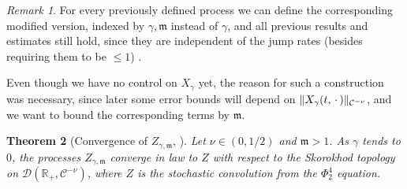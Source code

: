 \documentclass{report}
\newcommand{\RR}{\mathbb{R}}
\DeclarePairedDelimiter\norm{\lVert}{\rVert}%
\newcommand{\Placeholder}{\,\mathrel{\cdot}\,}
\newtheorem{theorem}{Theorem}[chapter]
\theoremstyle{remark}
\newtheorem{remark}[theorem]{Remark}
\theoremstyle{definition}
\begin{document}
\begin{remark}
  \label{remark:all_previous_results_hold}
  For every previously defined process we can define the corresponding modified version, indexed by ${\gamma, \mathfrak{m}}$ instead of $\gamma$, and all previous results and estimates still hold, since they are independent of the jump rates (besides requiring them to be $\le 1$) \cite[p39]{mourrat2015convergencetwodimensionaldynamicisingkac}.
\end{remark}

Even though we have no control on $X_\gamma$ yet, the reason for such a construction was necessary, since later some error bounds will depend on $\norm{X_\gamma(t, \Placeholder)}_{\mathcal{C}^{-\nu}}$, and we want to bound the corresponding terms by $\mathfrak{m}$.

\begin{theorem}[Convergence of $Z_{\gamma,\mathfrak{m}}$, {\cite[Theorem 6.1]{mourrat2015convergencetwodimensionaldynamicisingkac}}]
  Let $\nu \in (0, 1/2)$ and $\mathfrak{m} > 1$. As $\gamma$ tends to $0$, the processes $Z_{\gamma, \mathfrak{m}}$ converge in law to $Z$ with respect to the Skorokhod topology on $\mathcal{D}(\RR_+, \mathcal{C}^{-\nu})$, where $Z$ is the stochastic convolution from the $\Phi^4_2$ equation.
\end{theorem}
\end{document}
